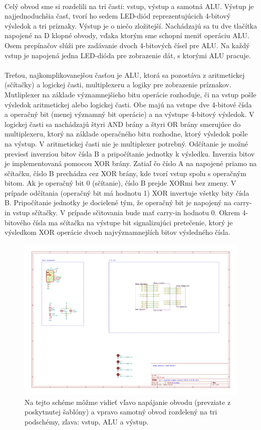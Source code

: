 \documentclass{article}
\begin{document}
    \paragraph{}
    Celý obvod sme si rozdelili na tri časti: vstup, výstup a samotná ALU. Výstup je najjednoduchšia časť, tvorí ho sedem LED-diód reprezentujúcich 4-bitový výsledok a tri príznaky. Výstup je o niečo zložitejší. Nachádzajú sa tu dve tlačítka napojené na D klopné obvody, vďaka ktorým sme schopní meniť operáciu ALU. Osem prepínačov slúži pre zadávanie dvoch 4-bitových čísel pre ALU. Na každý vstup je napojená jedna LED-dióda pre zobrazenie dát, s ktorými ALU pracuje.
    \paragraph{}
    Treťou, najkomplikovanejšou časťou je ALU, ktorá sa pozostáva z aritmetickej (sčítačky) a logickej časti, multiplexeru a logiky pre zobrazenie príznakov. Mutliplexer na základe významnejšieho bitu operácie rozhoduje, či na vstup pošle výsledok aritmetickej alebo logickej časti. Obe majú na vstupe dve 4-bitové čísla a operačný bit (menej významný bit operácie) a na výstupe 4-bitový výsledok. V logickej časti sa nachádzajú štyri AND brány a štyri OR brány smerujúce do multiplexeru, ktorý na základe operačného bitu rozhodne, ktorý výsledok pošle na výstup. V aritmetickej časti nie je multiplexer potrebný. Odčítanie je možné previesť inverziou bitov čísla B a pripočítanie jednotky k výsledku. Inverzia bitov je implementovaná pomocou XOR brány. Zatiaľ čo číslo A na napojené priamo na sčítačku, číslo B prechádza cez XOR brány, kde tvorí vstup spolu s operačným bitom. Ak je operačný bit 0 (sčítanie), číslo B prejde XORmi bez zmeny. V prípade odčítania (operačný bit má hodnotu 1) XOR invertuje všetky bity čísla B. Pripočítanie jednotky je docielené tým, že operačný bit je napojený na carry-in vstup sčítačky. V prípade sčitovania bude mať carry-in hodnotu 0. Okrem 4-bitového čísla ma sčítačka na výstupe bit signalizujúci pretečenie, ktorý je výsledkom XOR operácie dvoch najvýznamnejších bitov výsledného čísla.

    \begin{figure}[h!]
        \centering
        \includegraphics[width=.8\linewidth]{top_sheet.pdf}
        \caption{Na tejto schéme môžme vidieť vľavo napájanie obvodu (prevziate z poskytnutej šablóny) a vpravo samotný obvod rozdelený na tri podschémy, zľava: vstup, ALU a výstup.}
    \end{figure}
\end{document}
